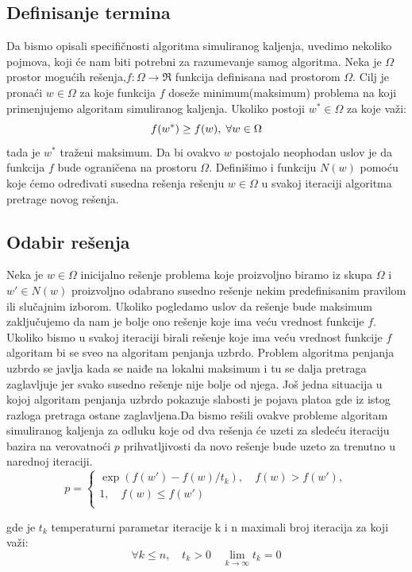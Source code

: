 \documentclass[a4paper]{article}
\begin{document}
\subsection{Definisanje termina}
Da bismo opisali specifičnosti algoritma simuliranog kaljenja, uvedimo nekoliko pojmova, koji će nam biti potrebni za razumevanje samog algoritma. Neka je $\Omega$ prostor mogućih rešenja,$f:\Omega \rightarrow \Re$ funkcija definisana nad prostorom $\Omega$. Cilj je pronaći  $w\in\Omega$ za koje funkcija $f$ doseže minimum(maksimum) problema na koji primenjujemo algoritam simuliranog kaljenja. Ukoliko postoji $w^*\in\Omega$ za koje  važi:$$f(w^*)\geq f(w),\hspace{0.1cm} \forall w \in \Omega$$ tada je $w^*$ traženi maksimum. Da bi ovakvo $w$ postojalo neophodan uslov je da funkcija $f$ bude ograničena na prostoru $\Omega$. Definišimo i funkciju $N(w)$ pomoću koje ćemo određivati susedna rešenja rešenju  $w\in\Omega$ u svakoj iteraciji algoritma pretrage novog rešenja. \par

\subsection{Odabir rešenja}
Neka je $w\in\Omega$ inicijalno rešenje problema koje proizvoljno biramo iz skupa $\Omega$ i $w'\in N(w)$ proizvoljno odabrano susedno rešenje nekim predefinisanim pravilom ili slučajnim izborom. Ukoliko pogledamo uslov da rešenje bude maksimum zaključujemo da nam je bolje ono rešenje koje ima veću vrednost funkcije $f$. Ukoliko bismo u svakoj iteraciji birali rešenje koje ima veću vrednost funkcije $f$ algoritam bi se sveo na algoritam penjanja uzbrdo. Problem algoritma penjanja uzbrdo se javlja kada se naiđe na lokalni maksimum i tu se dalja pretraga zaglavljuje jer svako susedno rešenje nije bolje od njega. Još jedna situacija u kojoj algoritam penjanja uzbrdo pokazuje slabosti je pojava platoa gde iz istog razloga pretraga ostane zaglavljena.Da bismo rešili ovakve probleme algoritam simuliranog kaljenja za odluku koje od dva rešenja će uzeti za sledeću iteraciju bazira na verovatnoći $p$ prihvatljivosti da novo rešenje bude uzeto za trenutno u narednoj iteraciji.
\[ p =
  \begin{cases}
    \exp(f(w')-f(w)/t_k),  \quad f(w) > f(w'),\\
    1,  \quad f(w) \leq f(w')\\
  \end{cases}
\]


gde je $t_k$ temperaturni parametar iteracije k i n maximali broj iteracija za koji važi:
$$\forall k\leq n, \quad t_k > 0 \quad \lim_{k \to \infty}t_k=0 $$
\end{document}
